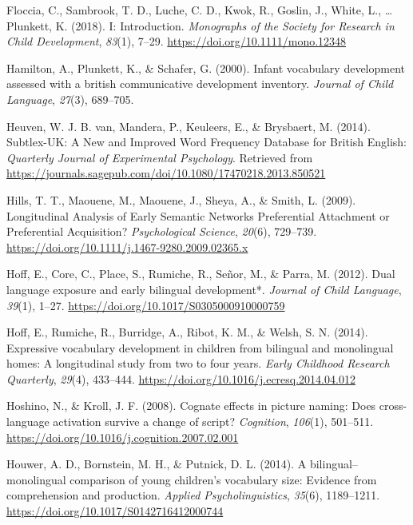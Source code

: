 \documentclass[
  english,
  man,man,floatsintext]{apa6}
\newlength{\cslhangindent}
\newenvironment{cslreferences}%
  {\setlength{\parindent}{0pt}%
  \everypar{\setlength{\hangindent}{\cslhangindent}}\ignorespaces}%
  {\par}
\begin{document}
\begin{cslreferences}
\leavevmode\hypertarget{ref-floccia_i_2018}{}%
Floccia, C., Sambrook, T. D., Luche, C. D., Kwok, R., Goslin, J., White, L., \ldots{} Plunkett, K. (2018). I: Introduction. \emph{Monographs of the Society for Research in Child Development}, \emph{83}(1), 7--29. \url{https://doi.org/10.1111/mono.12348}

\leavevmode\hypertarget{ref-hamilton_infant_2000}{}%
Hamilton, A., Plunkett, K., \& Schafer, G. (2000). Infant vocabulary development assessed with a british communicative development inventory. \emph{Journal of Child Language}, \emph{27}(3), 689--705.

\leavevmode\hypertarget{ref-heuven_subtlex-uk_2014}{}%
Heuven, W. J. B. van, Mandera, P., Keuleers, E., \& Brysbaert, M. (2014). Subtlex-UK: A New and Improved Word Frequency Database for British English: \emph{Quarterly Journal of Experimental Psychology}. Retrieved from \url{https://journals.sagepub.com/doi/10.1080/17470218.2013.850521}

\leavevmode\hypertarget{ref-hills_longitudinal_2009}{}%
Hills, T. T., Maouene, M., Maouene, J., Sheya, A., \& Smith, L. (2009). Longitudinal Analysis of Early Semantic Networks Preferential Attachment or Preferential Acquisition? \emph{Psychological Science}, \emph{20}(6), 729--739. \url{https://doi.org/10.1111/j.1467-9280.2009.02365.x}

\leavevmode\hypertarget{ref-hoff_dual_2012}{}%
Hoff, E., Core, C., Place, S., Rumiche, R., Señor, M., \& Parra, M. (2012). Dual language exposure and early bilingual development*. \emph{Journal of Child Language}, \emph{39}(1), 1--27. \url{https://doi.org/10.1017/S0305000910000759}

\leavevmode\hypertarget{ref-hoff_expressive_2014}{}%
Hoff, E., Rumiche, R., Burridge, A., Ribot, K. M., \& Welsh, S. N. (2014). Expressive vocabulary development in children from bilingual and monolingual homes: A longitudinal study from two to four years. \emph{Early Childhood Research Quarterly}, \emph{29}(4), 433--444. \url{https://doi.org/10.1016/j.ecresq.2014.04.012}

\leavevmode\hypertarget{ref-hoshino_cognate_2008}{}%
Hoshino, N., \& Kroll, J. F. (2008). Cognate effects in picture naming: Does cross-language activation survive a change of script? \emph{Cognition}, \emph{106}(1), 501--511. \url{https://doi.org/10.1016/j.cognition.2007.02.001}

\leavevmode\hypertarget{ref-houwer_bilingualmonolingual_2014}{}%
Houwer, A. D., Bornstein, M. H., \& Putnick, D. L. (2014). A bilingual--monolingual comparison of young children's vocabulary size: Evidence from comprehension and production. \emph{Applied Psycholinguistics}, \emph{35}(6), 1189--1211. \url{https://doi.org/10.1017/S0142716412000744}


\end{cslreferences}
\end{document}
